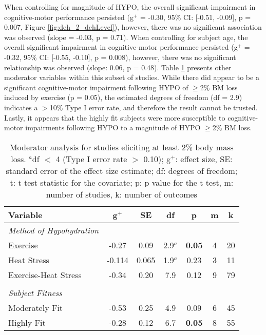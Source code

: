 When controlling for magnitude of HYPO, the overall significant impairment in cognitive-motor performance persisted (g${^+}$ = -0.30, 95\% CI: [-0.51, -0.09], p = 0.007, Figure \ref{fig:deh_2_dehLevel}), however, there was no significant association was observed (slope = -0.03, p = 0.71). When controlling for subject age, the overall significant impairment in cognitive-motor performance persisted (g${^+}$ = -0.32, 95\% CI: [-0.55, -0.10], p = 0.008), however, there was no significant relationship was observed (slope: 0.06, p = 0.48). Table \ref{tbl:ehs_2_moderators} presents other moderator variables within this subset of studies. While there did appear to be a significant cognitive-motor impairment following HYPO of ${\geq}$2\% BM loss induced by exercise (p = 0.05), the estimated degrees of freedom (df = 2.9) indicates a ${>}$10\% Type I error rate, and therefore the result cannot be trusted. Lastly, it appears that the highly fit subjects were more susceptible to cognitive-motor impairments following HYPO to a magnitude of HYPO ${\ge}$2\% BM loss.   

\begin{table}
	\caption{Moderator analysis for studies eliciting at least 2\% body mass loss. ${^a}$df ${<}$ 4 (Type I error rate ${>}$ 0.10); g${^+}$: effect size, SE: standard error of the effect size estimate; df: degrees of freedom; t: t test statistic for the covariate; p: p value for the t test, m: number of studies, k: number of outcomes}
	\centering
	\begin{tabular}{lcccccc} 
		\hline
		\textbf{Variable} & \textbf{g${^+}$} & \textbf{SE} & \textbf{df} & \textbf{p} & \textbf{m} & 
		\textbf{k} \\
		\hline
		\textit{Method of Hypohydration} &&&&&& \\
		Exercise & -0.27 & 0.09 & 2.9${^a}$ & \textbf{0.05} & 4 & 20 \\
		Heat Stress & -0.114 & 0.065 & 1.9${^a}$ & 0.23 & 3 & 11 \\
		Exercise-Heat Stress & -0.34 & 0.20 & 7.9 & 0.12 & 9 & 79 \\
		&&&&&& \\
		\textit{Subject Fitness} &&&&&& \\
		Moderately Fit & -0.53 & 0.25 & 4.9 & 0.09 & 6 & 45 \\
		Highly Fit & -0.28 & 0.12 & 6.7 & \textbf{0.05} & 8 & 55 \\ 
		\hline		    
	\end{tabular}
	\label{tbl:ehs_2_moderators}
\end{table}


